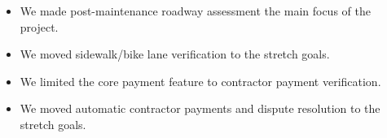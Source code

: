 \documentclass{article}
\begin{document}
\begin{enumerate}
    \begin{itemize}
        \item We made post-maintenance roadway assessment the main focus of the project.
        \item We moved sidewalk/bike lane verification to the stretch goals.
        \item We limited the core payment feature to contractor payment verification.
        \item We moved automatic contractor payments and dispute resolution to the stretch goals.
    \end{itemize}

\end{enumerate}
\end{document}
